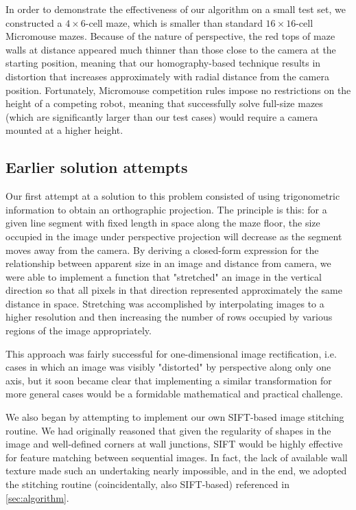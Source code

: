 \documentclass[10pt,twocolumn,letterpaper]{article}
\begin{document}
In order to demonstrate the effectiveness of our algorithm on a small test set, we constructed a $4\times 6$-cell maze,
which is smaller than standard $16\times 16$-cell Micromouse mazes.  Because of the nature of perspective, the red tops
of maze walls at distance appeared much thinner than those close to the camera at the starting position, meaning that
our homography-based technique results in distortion that increases approximately with radial distance from the camera
position.  Fortunately, Micromouse competition rules impose no restrictions on the height of a competing robot, meaning
that successfully solve full-size mazes (which are significantly larger than our test cases) would require a camera
mounted at a higher height.

\subsection{Earlier solution attempts}
\label{sub:earlierattempts}

Our first attempt at a solution to this problem consisted of using trigonometric information to obtain an orthographic
projection.  The principle is this: for a given line segment with fixed length in space along the maze floor, the size
occupied in the image under perspective projection will decrease as the segment moves away from the camera.  By deriving
a closed-form expression for the relationship between apparent size in an image and distance from camera, we were able
to implement a function that "stretched" an image in the vertical direction so that all pixels in that direction
represented approximately the same distance in space.  Stretching was accomplished by interpolating images to a higher
resolution and then increasing the number of rows occupied by various regions of the image appropriately.

This approach was fairly successful for one-dimensional image rectification, i.e. cases in which an image was visibly
"distorted" by perspective along only one axis, but it soon became clear that implementing a similar transformation for
more general cases would be a formidable mathematical and practical challenge.

We also began by attempting to implement our own SIFT-based image stitching routine.  We had originally reasoned that
given the regularity of shapes in the image and well-defined corners at wall junctions, SIFT would be highly effective
for feature matching between sequential images.  In fact, the lack of available wall texture made such an undertaking
nearly impossible, and in the end, we adopted the stitching routine (coincidentally, also SIFT-based) referenced in
\textsection\ref{sec:algorithm}.
\end{document}
